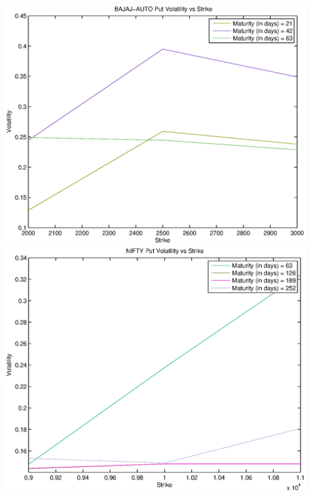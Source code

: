 \documentclass{article}
\begin{document}
\includegraphics[width=\textwidth]{BAJAJ-AUTO_Put_Volatility_vs_Strike} \\                 
\includegraphics[width=\textwidth]{NIFTY_Put_Volatility_vs_Strike} \\
\end{document}
